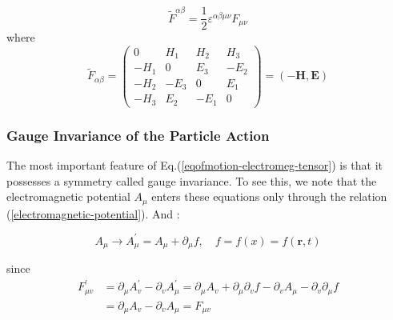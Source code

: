 \begin{qt}
    \begin{equation}
\tilde{F}^{\alpha \beta}=\frac{1}{2} \varepsilon^{\alpha \beta \mu \nu} F_{\mu \nu}
\end{equation}
where
\begin{equation}
\tilde{F}_{\alpha \beta}=\left(\begin{array}{cccc}
{0} & {H_{1}} & {H_{2}} & {H_{3}} \\
{-H_{1}} & {0} & {E_{3}} & {-E_{2}} \\
{-H_{2}} & {-E_{3}} & {0} & {E_{1}} \\
{-H_{3}} & {E_{2}} & {-E_{1}} & {0}
\end{array}\right)=(\mathbf{-H}, \mathbf{E})
\end{equation}
\end{qt}
\subsubsection{Gauge Invariance of the Particle Action}
The most important feature of Eq.(\ref{eqofmotion-electromeg-tensor}) is that it possesses a symmetry called gauge invariance. To see this, we note that the electromagnetic potential $A_{\mu}$ enters these equations only through the relation (\ref{electromagnetic-potential}). And :
\begin{qt}
    \begin{equation}
A_{\mu} \rightarrow A_{\mu}^{\prime}=A_{\mu}+\partial_{\mu} f, \quad f=f(x)=f(\mathbf{r}, t)
\end{equation}
\end{qt}
since
$$
\begin{aligned}
F_{\mu v}^{\prime} &=\partial_{\mu} A_{v}^{\prime}-\partial_{v} A_{\mu}^{\prime}=\partial_{\mu} A_{v}+\partial_{\mu} \partial_{v} f-\partial_{v} A_{\mu}-\partial_{v} \partial_{\mu} f \\
&=\partial_{\mu} A_{v}-\partial_{v} A_{\mu}=F_{\mu v}
\end{aligned}
$$

